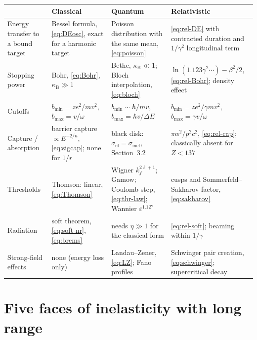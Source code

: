 \documentclass[11pt,a4paper]{book}
\numberwithin{equation}{chapter}
\newcommand{\kB}{\kappa_{\mathrm B}}
\begin{document}
\medskip
\noindent\small
\begin{tabular}{@{}>{\raggedright\arraybackslash}p{2.3cm}>{\raggedright\arraybackslash}p{3.7cm}>{\raggedright\arraybackslash}p{4.2cm}>{\raggedright\arraybackslash}p{4.2cm}@{}}
\hline
 & \textbf{Classical} & \textbf{Quantum} & \textbf{Relativistic}\\
\hline
Energy transfer to a bound target &
  Bessel formula, \eqref{eq:DEosc}, exact for a harmonic target &
  Poisson distribution with the same mean, \eqref{eq:poisson} &
  \eqref{eq:rel-DE} with contracted duration and $1/\gamma^2$ longitudinal term\\[6pt]
Stopping power &
  Bohr, \eqref{eq:Bohr}, $\kB\gg1$ &
  Bethe, $\kB\ll1$; Bloch interpolation, \eqref{eq:bloch} &
  $\ln(1.123\gamma^2\cdots)-\beta^2/2$, \eqref{eq:rel-Bohr}; density effect\\[6pt]
Cutoffs &
  $b_{\min}=ze^2/mv^2$, $b_{\max}=v/\omega$ &
  $b_{\min}\sim\hbar/mv$, $b_{\max}=\hbar v/\Delta E$ &
  $b_{\min}=ze^2/\gamma mv^2$, $b_{\max}=\gamma v/\omega$\\[6pt]
Capture / absorption &
  barrier capture $\propto E^{-2/n}$, \eqref{eq:sigcap}; none for $1/r$ &
  black disk: $\sigma_{\mathrm{el}}=\sigma_{\mathrm{inel}}$, Section~3.2 &
  $\pi\alpha^2/p^2c^2$, \eqref{eq:rel-cap}; classically absent for $Z<137$\\[6pt]
Thresholds &
  Thomson: linear, \eqref{eq:Thomson} &
  Wigner $k_f^{2\ell+1}$; Gamow; Coulomb step, \eqref{eq:thr-law}; Wannier $\varepsilon^{1.127}$ &
  cusps and Sommerfeld--Sakharov factor, \eqref{eq:sakharov}\\[6pt]
Radiation &
  soft theorem, \eqref{eq:soft-nr}, \eqref{eq:brems} &
  needs $\eta\gg1$ for the classical form &
  \eqref{eq:rel-soft}; beaming within $1/\gamma$\\[6pt]
Strong-field effects &
  none (energy loss only) &
  Landau--Zener, \eqref{eq:LZ}; Fano profiles &
  Schwinger pair creation, \eqref{eq:schwinger}; supercritical decay\\
\hline
\end{tabular}
\normalsize

\section{Five faces of inelasticity with long range}
\end{document}
